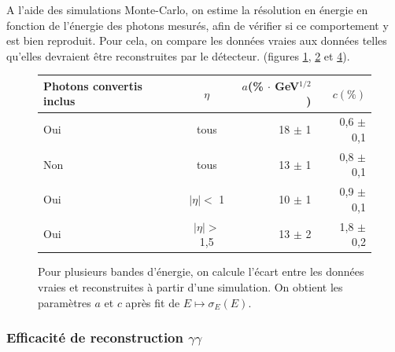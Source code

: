 \documentclass[11pt]{article} %
\begin{document}
A l'aide des simulations Monte-Carlo, on estime la résolution en énergie en fonction de l'énergie des photons mesurés, afin de vérifier si ce comportement y est bien reproduit. Pour cela, on compare les données vraies aux données telles qu'elles devraient être reconstruites par le détecteur. (figures \ref{fig:resolution_energie_photons_tab}, \ref{fig:resolution_energie_photons} et \ref{fig:resolution_energie_photons2}).

\begin{figure}[H]
\centering
\begin{tabular}{|l|c|r|r|} 
   \hline
   Photons convertis inclus &$\eta$ & $a$(\% $\cdot$ GeV${ }^{1/2}$) & $c (\%)$ \\
    \hline
   Oui & tous & 18  $\pm$ 1  &0,6  $\pm$ 0,1  \\
  \hline
   Non & tous & 13  $\pm$ 1  &0,8  $\pm$ 0,1  \\
  \hline
   Oui &$|\eta| < $ 1 & 10  $\pm$ 1  &0,9  $\pm$ 0,1  \\
\hline
   Oui & $|\eta| >$ 1,5 & 13  $\pm$ 2  &1,8  $\pm$ 0,2  \\
\hline
\end{tabular}
\caption{ Pour plusieurs bandes d'énergie, on calcule l'écart entre les données vraies et reconstruites à partir d'une simulation. On obtient les paramètres $a$ et $c$ après fit de $E \mapsto \sigma_E(E)$.  }
\label{fig:resolution_energie_photons_tab} 
\end{figure}

\begin{figure}[H]
\begin{subfigure}[b]{.5\linewidth}
\centering
\label{fig:resolution_energie_photons} 
 \resizebox{1.1\linewidth}{!}{}
\end{subfigure}%
\begin{subfigure}[b]{.5\linewidth}
\centering
\label{fig:resolution_energie_photons2} 
 \resizebox{1.1\linewidth}{!}{}
\end{subfigure}
\end{figure}

\subsubsection{Efficacité de reconstruction $\gamma\gamma$}
\end{document}
